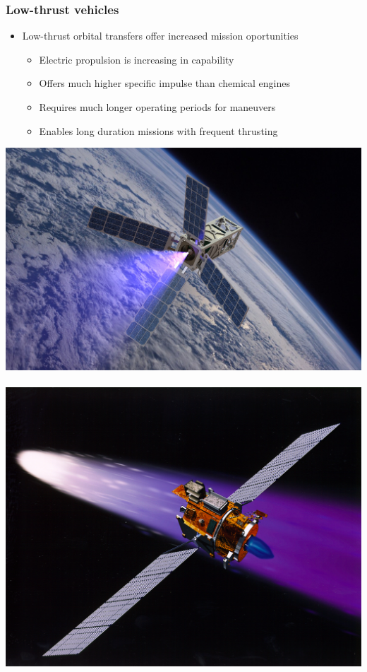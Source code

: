 \begin{frame} %
\frametitle{Low-thrust vehicles} %
\begin{itemize}
    \item Low-thrust orbital transfers offer increased mission oportunities
    \begin{itemize}
        \item Electric propulsion is increasing in capability
        \item Offers much higher specific impulse than chemical engines 
        \item Requires much longer operating periods for maneuvers 
        \item Enables long duration missions with frequent thrusting
    \end{itemize}
\end{itemize}

\begin{center}
    \includegraphics[height=0.5\textheight]{figures/patriot_plume.jpg}
    ~
    \includegraphics[height=0.5\textheight]{figures/deepspace1.jpg}
\end{center}
\end{frame}   %

